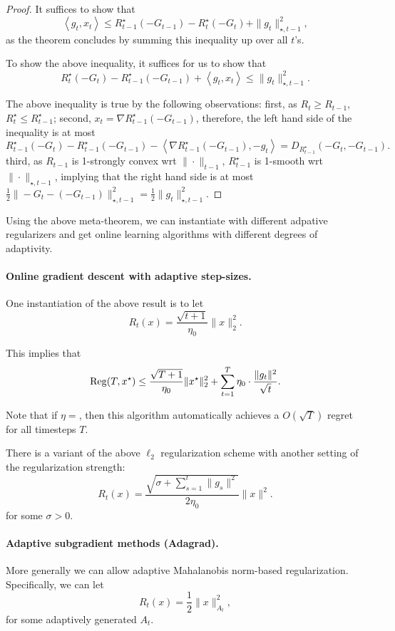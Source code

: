 \documentclass{article}
\DeclareMathOperator*{\Reg}{{\rm Reg}}
\newcommand{\inner}[2]{\left\langle #1,#2 \right\rangle}
\begin{document}
\begin{proof}
It suffices to show that
\[ \inner{g_t}{x_t} \leq R_{t-1}^\star(-G_{t-1}) - R_t^\star(-G_t) + \| g_t \|_{\star, t-1}^2, \]
as the theorem concludes by summing this inequality up over all $t$'s.

To show the above inequality, it suffices for us to show that
\[ R_t^\star(-G_t) - R_{t-1}^\star(-G_{t-1}) + \inner{g_t}{x_t} \leq \| g_t \|_{\star, t-1}^2. \]

The above inequality is true by the following observations: first, as $R_t \geq R_{t-1}$, $R_t^\star \leq R_{t-1}^\star$; second, $x_t = \nabla R_{t-1}^\star(-G_{t-1})$, therefore,
the left hand side of the inequality is at most
\[ R_{t-1}^\star(-G_t) - R_{t-1}^\star(-G_{t-1}) - \inner{\nabla R_{t-1}^\star(-G_{t-1})}{-g_t} = D_{R_{t-1}^\star}(-G_t, -G_{t-1}). \]
third, as $R_{t-1}$ is 1-strongly convex wrt $\| \cdot \|_{t-1}$, $R_{t-1}^\star$ is 1-smooth wrt $\| \cdot \|_{\star, t-1}$, implying that the right hand side is at most $\frac12 \| -G_t - (-G_{t-1}) \|_{\star, t-1}^2 = \frac12 \| g_t \|_{\star, t-1}^2$.
\end{proof}

Using the above meta-theorem, we can instantiate with different adpative regularizers and get online learning algorithms with different degrees of adaptivity.

\paragraph{Online gradient descent with adaptive step-sizes.} One instantiation of the above result is to let
\[ R_t(x) = \frac{\sqrt{t+1}}{\eta_0 } \| x \|_2^2. \]

This implies that
\[ \Reg(T, x^\star) \leq \frac{\sqrt{T+1}}{\eta_0} \| x^\star \|_2^2 + \sum_{t=1}^T \eta_0 \cdot \frac{\| g_t \|^2}{\sqrt{t}}.  \]

Note that if $\eta = $, then this algorithm automatically achieves a $O(\sqrt{T})$ regret for all timesteps $T$.

There is a variant of the above $\ell_2$ regularization scheme with another setting of the regularization strength:
\[ R_t(x) = \frac{\sqrt{\sigma + \sum_{s=1}^{t} \| g_s \|^2}}{2 \eta_0} \| x \|^2. \]
for some $\sigma > 0$.

\paragraph{Adaptive subgradient methods (Adagrad).} More generally we can allow adaptive Mahalanobis norm-based regularization. Specifically, we can let
\[ R_t(x) = \frac12 \| x \|_{A_t}^2, \]
for some adaptively generated $A_t$.
\end{document}
